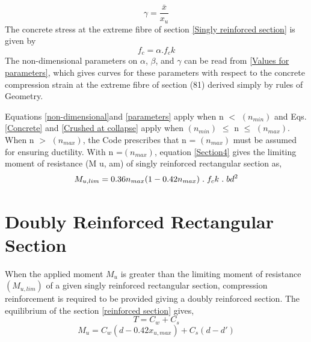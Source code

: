 \begin{equation}
\gamma = \frac{\bar{x}}{x_u}
\label{stress}
\end{equation}
The concrete stress at the extreme ﬁbre of section \fig \ref{Singly reinforced section} is given by
\begin{equation}
f_c = \alpha.f_ck
\label{extreme fibre section}
\end{equation}
The non-dimensional parameters on $\alpha$, $\beta$, and $\gamma$ can be read from \fig \ref{Values for parameters}, which gives curves for
these parameters with respect to the concrete compression strain at the extreme ﬁbre of section
(81) derived simply by rules of Geometry.


Equations \eqn \ref{non-dimensional}and \eqn \ref{parameters} apply when n $<$ $(n_{min})$ and Eqs. \eqn \ref{Concrete} and \eqn \ref{Crushed at collapse} apply when $(n_{min})$ ${\leq}$ n ${\leq}$ $(n_{max})$.
When n $>$ $(n_{max})$, the Code prescribes that n = $(n_{max})$ must be assumed for
ensuring ductility. With n =$(n_{max})$, equation \eqn \ref{Section4} gives the limiting moment of resistance
(M u, am) of singly reinforced rectangular section as,
\begin{equation}
M_{u,lim} = 0.36 n_{max}(1-0.42n_{max})\hspace{0.1cm}.\hspace{0.1cm}f_ck\hspace{0.1cm}.\hspace{0.1cm}bd^2
\label{Singly R Section}
\end{equation}
\section{Doubly Reinforced Rectangular Section}
When the applied moment $M_u$ is greater than the limiting moment of resistance $(M_{u,lim})$
of a given singly reinforced rectangular section, compression reinforcement is required to be
provided giving a doubly reinforced section. The equilibrium of the section \fig \ref{reinforced section} gives,
\begin{equation}
T = C_w + C_s
\label{Equillibrium of section}
\end{equation}
\begin{equation}
M_u = C_w(d-0.42x_{u,max}) + C_s(d-d ')
\label{EOSII}
\end{equation}

